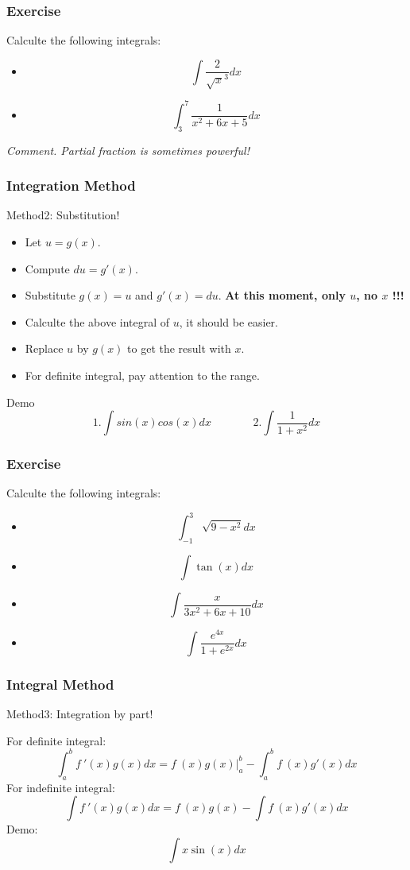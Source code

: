 \documentclass{beamer}
\newcommand{\myfont}{\rmfamily\normalsize\upshape\mdseries}
\begin{document}
\begin{frame}
    \frametitle{Exercise}
    Calculte the following integrals:
    \begin{itemize}
        \item $$\int \frac{2}{\sqrt{x}^3} dx$$
        \item $$\int_3^7 \frac{1}{x^2+6x+5} dx$$
    \end{itemize}
    \vspace{1em}
    \hspace{1em}
    \itshape
    Comment. Partial fraction is sometimes powerful!\myfont
\end{frame}
\begin{frame}
    \frametitle{Integration Method}
    Method2: Substitution!\\
    \vspace{1em}
    \begin{itemize}
        \item Let $u=g(x)$.
        \item Compute $du=g'(x)$.
        \item Substitute $g(x)=u$ and $g'(x)=du$. \textbf{At this moment, only $u$, no $x$ !!!}
        \item Calculte the above integral of $u$, it should be easier.
        \item Replace $u$ by $g(x)$ to get the result with $x$.
        \item For definite integral, pay attention to the range.
    \end{itemize}
    \begin{block}{Demo}
        $$1. \int sin(x) cos(x) dx ~~~~~~~~~~~~~~~~~2.\int \frac{1}{1+x^2} dx$$
    \end{block}
\end{frame}
\begin{frame}
    \frametitle{Exercise}
    Calculte the following integrals:
    \begin{itemize}
        \item $$\int_{-1}^3 \sqrt{9-x^2} dx$$
        \item $$\int \tan(x) dx$$
        \item $$\int \frac{x}{3x^2+6x+10} dx$$
        \item $$\int \frac{e^{4x}}{1+e^{2x}} dx$$
    \end{itemize}
\end{frame}
\begin{frame}
    \frametitle{Integral Method}
    Method3: Integration by part!\\
    \vspace{1em}

    For definite integral:
    $$\int_a^b f~'(x)g(x) dx=f~(x)g(x) \Big|_a^b-\int_a^b f~(x)g'(x) dx$$
    For indefinite integral:
    $$\int f~'(x)g(x) dx=f~(x)g(x) -\int f~(x)g'(x) dx$$
    Demo:
    $$\int x \sin (x) dx$$
\end{frame}
\end{document}
